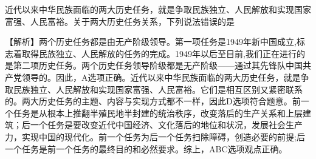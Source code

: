 \question 近代以来中华民族面临的两大历史任务，就是争取民族独立、人民解放和实现国家富强、人民富裕。关于两大历史任务关系，下列说法错误的是
\par{}
\begin{solution}【解析】两个历史任务都是由无产阶级领导。第一项任务是1949年新中国成立,标志着取得民族独立、人民解放的任务的完成。1949年以后至目前,我们正在进行的是第二项历史任务。两个历史任务领导阶级都是无产阶级------通过其先锋队中国共产党领导的。因此，A选项正确。近代以来中华民族面临的两大历史任务，就是争取民族独立、人民解放和实现国家富强、人民富裕。它们是相互区别又紧密联系的。两大历史任务的主题、内容与实现方式都不一样，因此D选项符合题意。前一个任务是从根本上推翻半殖民地半封建的统治秩序，改变落后的生产关系和上层建筑；后一个任务是要改变近代中国经济、文化落后的地位和状况，发展社会生产
力，实现中国的现代化。前一个任务为后一个任务扫除障碍，创造必要的前提;后一个任务是前一个任务的最终目的和必然要求。综上，ABC选项观点正确。
\end{solution}
